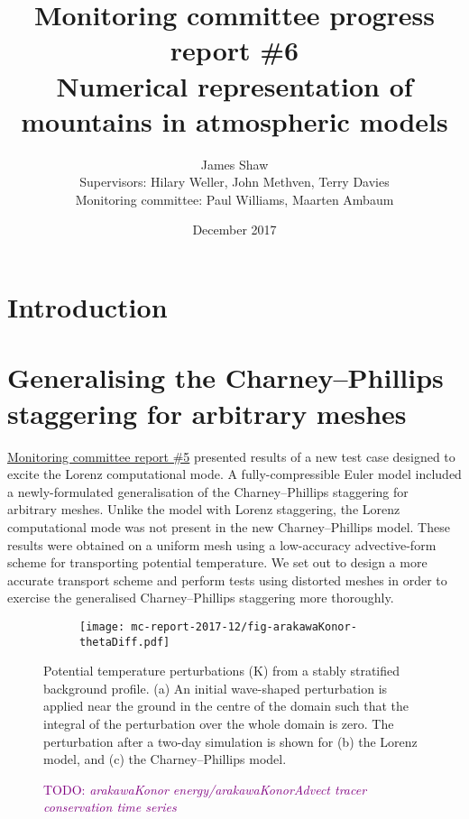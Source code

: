 \documentclass[a4paper,11pt]{article}
\title{
\vspace*{-2em}
Monitoring committee progress report \#6\\
\vspace*{1em}
\Large{Numerical representation of mountains in atmospheric models}}
\author{James Shaw
\vspace{0.5em} \\
\large{Supervisors: Hilary Weller, John Methven, Terry Davies}
\vspace{0.5em} \\
\large{Monitoring committee: Paul Williams, Maarten Ambaum}}
\date{December 2017}
\newcommand{\TODO}[1]{\textcolor{purple}{TODO: \emph{#1}}}
\begin{document}
\maketitle

\section{Introduction}

\section{Generalising the Charney--Phillips staggering for arbitrary meshes}

\href{http://www.datumedge.co.uk/publications/mc-report-2017-06.pdf}{Monitoring committee report \#5} presented results of a new test case designed to excite the Lorenz computational mode.  A fully-compressible Euler model included a newly-formulated generalisation of the Charney--Phillips staggering for arbitrary meshes.
Unlike the model with Lorenz staggering, the Lorenz computational mode was not present in the new Charney--Phillips model.
These results were obtained on a uniform mesh using a low-accuracy advective-form scheme for transporting potential temperature.  We set out to design a more accurate transport scheme and perform tests using distorted meshes in order to exercise the generalised Charney--Phillips staggering more thoroughly.

\begin{figure}
	\centering
	\begin{subfigure}{\textwidth}
		\label{fig:arakawaKonor:theta_diff:initial}
		\label{fig:arakawaKonor:theta_diff:lorenz}
		\label{fig:arakawaKonor:theta_diff:cp}
		\texttt{[image: mc-report-2017-12/fig-arakawaKonor-thetaDiff.pdf]}
	\end{subfigure}
	\caption{Potential temperature perturbations (\si{\kelvin}) from a stably stratified background profile.
	(a) An initial wave-shaped perturbation is applied near the ground in the centre of the domain such that the integral of the perturbation over the whole domain is zero.
	The perturbation after a two-day simulation is shown for (b) the Lorenz model, and (c) the Charney--Phillips model.
	}
	\label{fig:arakawaKonor:theta_diff}
\end{figure}

\begin{figure}
	\caption{\TODO{arakawaKonor energy/arakawaKonorAdvect tracer conservation time series}}
	\label{fig:arakawaKonor:conservation}
\end{figure}
\end{document}
